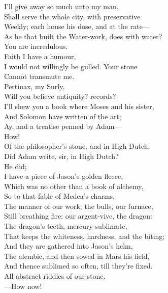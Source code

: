 \documentclass[a4paper,oneside,12pt]{memoir}
\begin{document}
\begin{drama*}
I'll give away so much unto my man,\\
Shall serve the whole city, with preservative\\
Weekly; each house his dose, and at the rate---\\
\surlyspeaks As he that built the Water-work, does with water?\\
\mammonspeaks You are incredulous.\\
\surlyspeaks {} Faith I have a humour,\\
I would not willingly be gulled. Your stone\\
Cannot transmute me.\\
\mammonspeaks {} Pertinax, my Surly,\\
Will you believe antiquity? records?\\
I'll shew you a book where Moses and his sister,\\
And Solomon have written of the art;\\
Ay, and a treatise penned by Adam---\\
\surlyspeaks {} How!\\
\mammonspeaks Of the philosopher's stone, and in High Dutch.\\
\surlyspeaks Did Adam write, sir, in High Dutch?\\
\mammonspeaks {} He did;\\
I have a piece of Jason's golden fleece,\\
Which was no other than a book of alchemy,\\
So to that fable of Medea's charms,\\
The manner of our work; the bulls, our furnace,\\
Still breathing fire; our argent-vive, the dragon:\\
The dragon's teeth, mercury sublimate,\\
That keeps the whiteness, hardness, and the biting;\\
And they are gathered into Jason's helm,\\
The alembic, and then sowed in Mars his field,\\
And thence sublimed so often, till they're fixed.\\
All abstract riddles of our stone.\\
 ---How now!\\

\end{drama*}
\end{document}
